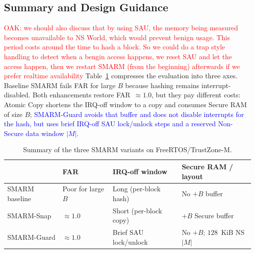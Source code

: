 \documentclass[conference]{IEEEtran}
\newcommand{\smarmcopy}{SMARM-Snap\xspace}
\newcommand{\smarmlock}{SMARM-Guard\xspace}
\newcommand\oak[1]{\textcolor{red}{OAK: #1}}
\newcommand\ben[1]{\textcolor{blue}{#1}}
\begin{document}
\subsection{Summary and Design Guidance}
\label{sec:guidance}

\oak{we should also discuss that by using SAU, the memory being measured becomes unavailable to NS World, which would prevent benign usage. This period costs around the time to hash a block. So we could do a trap style handling to detect when a bengin access happens, we reset SAU and let the access happen, then we restart SMARM (from the beginning) afterwards if we prefer realtime availability}
Table~\ref{tab:metric_summary} compresses the evaluation into three axes.
Baseline SMARM fails FAR for large $B$ because hashing remains
interrupt-disabled. Both enhancements restore FAR~$\approx 1.0$, but they
pay different costs: Atomic Copy shortens the IRQ-off window to a copy and consumes Secure RAM of size $B$; \ben{\smarmlock{} avoids that
buffer and does not disable interrupts for the hash, but uses brief
IRQ-off SAU lock/unlock steps and a reserved Non-Secure data window
$|M|$.}

\begin{table}[!t]
  \centering
  \footnotesize
  \caption{Summary of the three SMARM variants on FreeRTOS/TrustZone-M.}
  \label{tab:metric_summary}
  \setlength{\tabcolsep}{2pt}
  \renewcommand{\arraystretch}{1.12}

  \begin{tabularx}{\columnwidth}{@{}
    >{\raggedright\arraybackslash}p{}
    >{\raggedright\arraybackslash}X
    >{\raggedright\arraybackslash}X
    >{\raggedright\arraybackslash}X
  @{}}
    \toprule
    & \textbf{FAR} & \textbf{IRQ-off window} & \textbf{Secure RAM / layout} \\
    \midrule
    SMARM baseline &
      Poor for large $B$ &
      Long (per-block hash) &
      No $+B$ buffer \\
    \smarmcopy &
      $\approx 1.0$ &
      Short (per-block copy) &
      $+B$ Secure buffer \\
    \smarmlock{} &
      $\approx 1.0$ &
      Brief SAU lock/unlock &
      No $+B$; $128$~KiB NS $|M|$ \\
    \bottomrule
  \end{tabularx}
\end{table}
\end{document}
